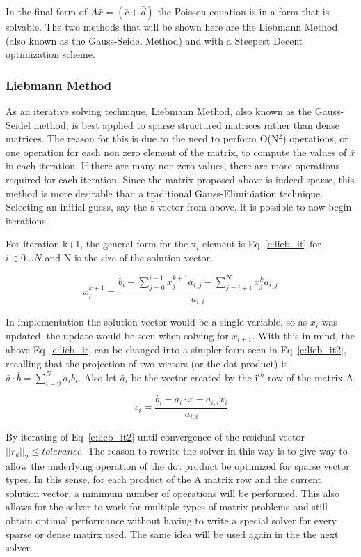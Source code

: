 \documentclass[]{aiaa-tc}%
\begin{document}
In the final form of $A \bar x = (\bar c + \bar d)$ the Poisson equation is in a
form that is solvable. The two methods that will be shown here are the Liebmann
Method (also known as the Gauss-Seidel Method) and with a Steepest Decent optimization
scheme.

\subsubsection{Liebmann Method}
As an iterative solving technique, Liebmann Method, also known as the Gauss-Seidel method,
is best applied to sparse structured matrices rather than dense matrices. The reason
for this is due to the need to perform O(N$^{2}$) operations, or one operation for
each non zero element of the matrix, to compute the values of $\bar x$ in each iteration.
If there are many non-zero values, there are more operations required for each iteration.
Since the matrix proposed above is indeed sparse, this method is more desirable than a
traditional Gauss-Eliminiation technique. Selecting an initial guess, say the $\bar b$
vector from above, it is possible to now begin iterations.

For iteration k+1, the general form for the x$_i$ element is Eq~\ref{e:lieb_it} for $i\in 0...N$
and N is the size of the solution vector.

\begin{equation}
  \label{e:lieb_it}
  x_i^{k+1} = \frac {b_i - \sum_{j=0}^{i-1} x_j^{k+1} a_{i,j} - \sum_{j=i+1}^{N} x_j^k a_{i,j}}{a_{i,i}}
\end{equation}

In implementation the solution vector would be a single variable, so as $x_i$ was
updated, the update would be seen when solving for $x_{i+1}$. With this in mind,
the above Eq~\ref{e:lieb_it} can be changed into a simpler form seen in Eq~\ref{e:lieb_it2},
recalling that the projection of two vectors (or the dot product) is
$\bar a \cdotp \bar b = \sum_{i=0}^{N} a_i b_i$. Also let $\bar a_i$ be the vector
created by the i$^{th}$ row of the matrix A.

\begin{equation}
  \label{e:lieb_it2}
  x_i = \frac {b_i - \bar a_{i} \cdotp \bar x + a_{i,i} x_i}{a_{i,i}}
\end{equation}

By iterating of Eq~\ref{e:lieb_it2} until convergence of the residual vector
$\vert\vert r_k \vert\vert_2 \leq tolerance$.
The reason to rewrite the solver in this way is to give way to allow the underlying
operation of the dot product be optimized for sparse vector types. In this sense, for
each product of the A matrix row and the current solution vector, a minimum number
of operations will be performed. This also allows for the solver to work for multiple
types of matrix problems and still obtain optimal performance without having to
write a special solver for every sparse or dense matirx used. The same idea will
be used again in the the next solver.
\end{document}
